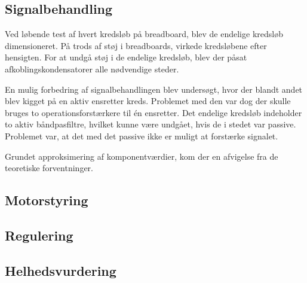 \subsection{Signalbehandling}
Ved løbende test af hvert kredsløb på breadboard, blev de endelige kredsløb dimensioneret. På trods af støj i breadboards, virkede kredsløbene efter hensigten. For at undgå støj i de endelige kredsløb, blev der påsat afkoblingskondensatorer alle nødvendige steder.

En mulig forbedring af signalbehandlingen blev undersøgt, hvor der blandt andet blev kigget på en aktiv ensretter kreds. Problemet med den var dog der skulle bruges to operationsforstærkere til én ensretter. Det endelige kredsløb indeholder to aktiv båndpasfiltre, hvilket kunne være undgået, hvis de i stedet var passive. Problemet var, at det med det passive ikke er muligt at forstærke signalet.

Grundet approksimering af komponentværdier, kom der en afvigelse fra de teoretiske forventninger.

\subsection{Motorstyring}

\subsection{Regulering}

\subsection{Helhedsvurdering}


